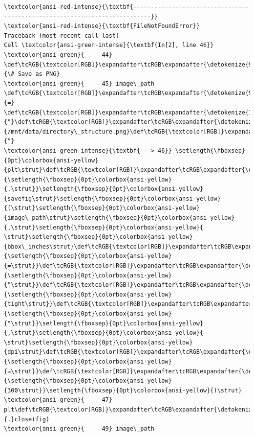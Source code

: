 \documentclass[11pt]{article}
\begin{document}
    \begin{Verbatim}[commandchars=\\\{\}, frame=single, framerule=2mm, rulecolor=\color{outerrorbackground}]
\textcolor{ansi-red-intense}{\textbf{---------------------------------------------------------------------------}}
\textcolor{ansi-red-intense}{\textbf{FileNotFoundError}}                         Traceback (most recent call last)
Cell \textcolor{ansi-green-intense}{\textbf{In[2], line 46}}
\textcolor{ansi-green}{     44} \def\tcRGB{\textcolor[RGB]}\expandafter\tcRGB\expandafter{\detokenize{95,135,135}}{\# Save as PNG}
\textcolor{ansi-green}{     45} image\_path \def\tcRGB{\textcolor[RGB]}\expandafter\tcRGB\expandafter{\detokenize{98,98,98}}{=} \def\tcRGB{\textcolor[RGB]}\expandafter\tcRGB\expandafter{\detokenize{175,0,0}}{"}\def\tcRGB{\textcolor[RGB]}\expandafter\tcRGB\expandafter{\detokenize{175,0,0}}{/mnt/data/directory\_structure.png}\def\tcRGB{\textcolor[RGB]}\expandafter\tcRGB\expandafter{\detokenize{175,0,0}}{"}
\textcolor{ansi-green-intense}{\textbf{---> 46}} \setlength{\fboxsep}{0pt}\colorbox{ansi-yellow}{plt\strut}\def\tcRGB{\textcolor[RGB]}\expandafter\tcRGB\expandafter{\detokenize{98,98,98}}{\setlength{\fboxsep}{0pt}\colorbox{ansi-yellow}{.\strut}}\setlength{\fboxsep}{0pt}\colorbox{ansi-yellow}{savefig\strut}\setlength{\fboxsep}{0pt}\colorbox{ansi-yellow}{(\strut}\setlength{\fboxsep}{0pt}\colorbox{ansi-yellow}{image\_path\strut}\setlength{\fboxsep}{0pt}\colorbox{ansi-yellow}{,\strut}\setlength{\fboxsep}{0pt}\colorbox{ansi-yellow}{ \strut}\setlength{\fboxsep}{0pt}\colorbox{ansi-yellow}{bbox\_inches\strut}\def\tcRGB{\textcolor[RGB]}\expandafter\tcRGB\expandafter{\detokenize{98,98,98}}{\setlength{\fboxsep}{0pt}\colorbox{ansi-yellow}{=\strut}}\def\tcRGB{\textcolor[RGB]}\expandafter\tcRGB\expandafter{\detokenize{175,0,0}}{\setlength{\fboxsep}{0pt}\colorbox{ansi-yellow}{"\strut}}\def\tcRGB{\textcolor[RGB]}\expandafter\tcRGB\expandafter{\detokenize{175,0,0}}{\setlength{\fboxsep}{0pt}\colorbox{ansi-yellow}{tight\strut}}\def\tcRGB{\textcolor[RGB]}\expandafter\tcRGB\expandafter{\detokenize{175,0,0}}{\setlength{\fboxsep}{0pt}\colorbox{ansi-yellow}{"\strut}}\setlength{\fboxsep}{0pt}\colorbox{ansi-yellow}{,\strut}\setlength{\fboxsep}{0pt}\colorbox{ansi-yellow}{ \strut}\setlength{\fboxsep}{0pt}\colorbox{ansi-yellow}{dpi\strut}\def\tcRGB{\textcolor[RGB]}\expandafter\tcRGB\expandafter{\detokenize{98,98,98}}{\setlength{\fboxsep}{0pt}\colorbox{ansi-yellow}{=\strut}}\def\tcRGB{\textcolor[RGB]}\expandafter\tcRGB\expandafter{\detokenize{98,98,98}}{\setlength{\fboxsep}{0pt}\colorbox{ansi-yellow}{300\strut}}\setlength{\fboxsep}{0pt}\colorbox{ansi-yellow}{)\strut}
\textcolor{ansi-green}{     47} plt\def\tcRGB{\textcolor[RGB]}\expandafter\tcRGB\expandafter{\detokenize{98,98,98}}{.}close(fig)
\textcolor{ansi-green}{     49} image\_path


\end{Verbatim}
\end{document}
